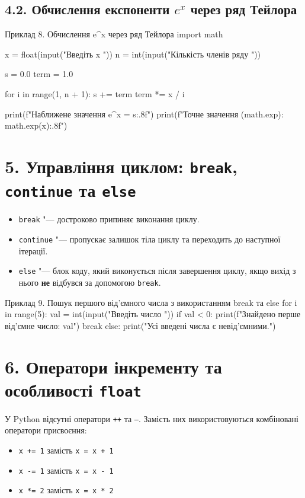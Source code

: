 \documentclass{scrreprt}
\begin{document}
	\subsection*{4.2. Обчислення експоненти $e^x$ через ряд Тейлора}

	\begin{py}{Приклад 8. Обчислення e^x через ряд Тейлора}
import math

x = float(input("Введіть x "))
n = int(input("Кількість членів ряду "))

s = 0.0
term = 1.0

for i in range(1, n + 1):
    s += term
    term *= x / i

print(f"Наближене значення e^{x} = {s:.8f}")
print(f"Точне значення (math.exp): {math.exp(x):.8f}")
	\end{py}

	\newpage

	\section*{5. Управління циклом: \texttt{break}, \texttt{continue} та \texttt{else}}

	\begin{itemize}
		\item \texttt{break} "--- достроково припиняє виконання циклу.
		\item \texttt{continue} "--- пропускає залишок тіла циклу та переходить до наступної ітерації.
		\item \texttt{else} "--- блок коду, який виконується після завершення циклу, якщо вихід з нього \textbf{не} відбувся за допомогою \texttt{break}.
	\end{itemize}

	\begin{py}{Приклад 9. Пошук першого від'ємного числа з використанням break та else}
for i in range(5):
    val = int(input("Введіть число "))
    if val < 0:
        print(f"Знайдено перше від'ємне число: {val}")
        break
else:
    print("Усі введені числа є невід'ємними.")
	\end{py}

	\vspace{0.3cm}

	\section*{6. Оператори інкременту та особливості \texttt{float}}

	У Python відсутні оператори \texttt{++} та \texttt{--}. Замість них використовуються комбіновані оператори присвоєння:
	\begin{itemize}
		\item \texttt{x += 1} замість \texttt{x = x + 1}
		\item \texttt{x -= 1} замість \texttt{x = x - 1}
		\item \texttt{x *= 2} замість \texttt{x = x * 2}
	\end{itemize}
\end{document}
